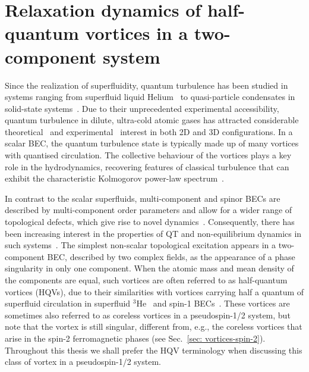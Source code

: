 \chapter{\label{chap: two-comp}Relaxation dynamics of half-quantum vortices in a
two-component system}

Since the realization of superfluidity, quantum turbulence has been studied
in systems ranging from superfluid liquid
Helium~\cite{Barenghi2014, Walmsley2014} to quasi-particle
condensates in solid-state systems~\cite{Kreil2018}.
Due to their unprecedented experimental accessibility, quantum turbulence in
dilute, ultra-cold atomic gases has attracted considerable
theoretical~\cite{Kobayashi2007,Numasato2010, Reeves2013, Billam2014,
Simula2014,Baggaley2018} and experimental~\cite{Henn2009,Kwon2014,Seo2017,
Navon2019,Gauthier2019, Johnstone2019} interest in both 2D and 3D
configurations.
In a scalar BEC, the quantum turbulence state is typically made up of many
vortices with quantised circulation.
The collective behaviour of the vortices plays a key role
in the hydrodynamics, recovering features of classical turbulence that can
exhibit the characteristic Kolmogorov power-law spectrum~\cite{Kobayashi2005}.

In contrast to the scalar superfluids, multi-component and spinor BECs are
described by multi-component order parameters and allow for a wider range of
topological defects, which give rise to novel dynamics~\cite{Kasamatsu2016,
    Weiss2019,Kobayashi2009,Kasamatsu2005}.
Consequently, there has been increasing interest in the properties of QT and
non-equilibrium dynamics in such
systems~\cite{Salman2009, Schmied2019, Karl2013, Prufer2018, Hofmann2014}.
The simplest non-scalar topological excitation appears in a two-component BEC,
described by two complex fields, as the appearance of a phase singularity in
only one component.
When the atomic mass and mean density of the components are equal, such vortices
are often referred to as half-quantum vortices (HQVs), due to their similarities
with vortices carrying half a quantum of superfluid circulation in superfluid
\(^3\)He~\cite{Autti2016} and spin-1 BECs~\cite{Leonhardt2000,Seo2015}.
These vortices are sometimes also referred to as coreless vortices in a
pseudospin-1/2 system, but note that the vortex is still singular, different
from, e.g., the coreless vortices that arise in the spin-2 ferromagnetic
phases (see Sec.~\ref{sec: vortices-spin-2}).
Throughout this thesis we shall prefer the HQV terminology when discussing
this class of vortex in a pseudospin-1/2 system.

